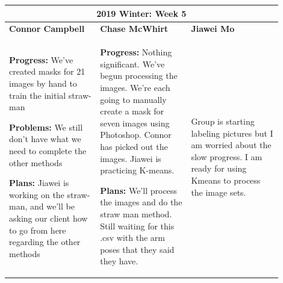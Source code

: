 \documentclass[10pt,journal,compsoc, draftclsnofoot,onecolumn]{IEEEtran}
\begin{document}
\begin{center}
\begin{tabular}{|p{0.3\linewidth}|p{0.3\linewidth}|p{0.3\linewidth}|}
\hline
\multicolumn{3}{|c|}{\textbf{2019 Winter: Week 5}} \\
\hline
\textbf{Connor Campbell} & \textbf{Chase McWhirt} & \textbf{Jiawei Mo} \\ [0.5ex]
\hline\hline

\textbf{Progress:} We've created masks for 21 images by hand to train the initial straw-man

\textbf{Problems:} We still don't have what we need to complete the other methods

\textbf{Plans:} Jiawei is working on the straw-man, and we'll be asking our client how to go from here regarding the other methods
&
\textbf{Progress:} Nothing significant.
We've begun processing the images.
We're each going to manually create a mask for seven images using Photoshop.
Connor has picked out the images. 
Jiawei is practicing K-means.

\textbf{Plans:} We'll process the images and do the straw man method.
Still waiting for this .csv with the arm poses that they said they have.
&
Group is starting labeling pictures but I am worried about the slow progress. I am ready for using Kmeans to process the image sets.
\\ \hline
\end{tabular}
\end{center}
\end{document}
